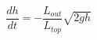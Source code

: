 \documentclass[preview]{standalone}
\begin{document}
\begin{equation*}
\frac{dh}{dt} = -\frac{L_{out}}{L_{top}}\sqrt{2gh}
\end{equation*}
\end{document}
